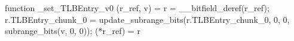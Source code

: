 function _set_TLBEntry_v0 (r_ref, v) = {
    r = __bitfield_deref(r_ref);
    r.TLBEntry_chunk_0 = update_subrange_bits(r.TLBEntry_chunk_0, 0, 0, subrange_bits(v, 0, 0));
    (*r_ref) = r
}
